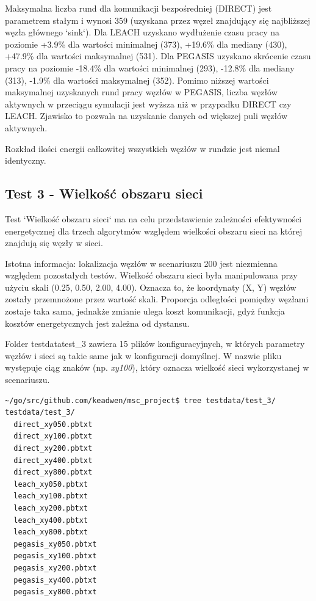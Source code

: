 \documentclass[a4paper,12pt,twoside,openany]{report}
\begin{document}
\par
Maksymalna liczba rund dla komunikacji bezpośredniej (DIRECT) jest parametrem stałym i wynosi 359 (uzyskana przez węzeł znajdujący się najbliższej węzła głównego `sink`).
Dla LEACH uzyskano wydłużenie czasu pracy na poziomie +3.9\% dla wartości minimalnej (373), +19.6\% dla mediany (430), +47.9\% dla wartości maksymalnej (531).
Dla PEGASIS uzyskano skrócenie czasu pracy na poziomie -18.4\% dla wartości minimalnej (293), -12.8\% dla mediany (313), -1.9\% dla wartości maksymalnej (352).
Pomimo niższej wartości maksymalnej uzyskanych rund pracy węzłów w PEGASIS, liczba węzłów aktywnych w przeciągu symulacji jest wyższa niż w przypadku DIRECT czy LEACH.
Zjawisko to pozwala na uzyskanie danych od większej puli węzłów aktywnych.
\par
Rozkład ilości energii całkowitej wszystkich węzłów w rundzie jest niemal identyczny.

\subsection{Test 3 - Wielkość obszaru sieci}

Test `Wielkość obszaru sieci` ma na celu przedstawienie zależności efektywności energetycznej dla trzech algorytmów względem wielkości obszaru sieci na której
znajdują się węzły w sieci.

Istotna informacja: lokalizacja węzłów w scenariuszu 200 jest niezmienna względem pozostałych testów. Wielkość obszaru sieci była manipulowana przy użyciu skali (0.25, 0.50, 2.00, 4.00).
Oznacza to, że koordynaty (X, Y) węzłów zostały przemnożone przez wartość skali. Proporcja odległości pomiędzy węzłami zostaje taka sama, jednakże zmianie ulega koszt komunikacji, gdyż 
funkcja kosztów energetycznych jest zależna od dystansu.

Folder testdata\/test\_3 zawiera 15 plików konfiguracyjnych, w których parametry węzłów i sieci są takie same jak w konfiguracji domyślnej.
W nazwie pliku występuje ciąg znaków (np. \textit{xy100}), który oznacza wielkość sieci wykorzystanej w scenariuszu.

\begin{lstlisting}
~/go/src/github.com/keadwen/msc_project$ tree testdata/test_3/
testdata/test_3/
  direct_xy050.pbtxt
  direct_xy100.pbtxt
  direct_xy200.pbtxt
  direct_xy400.pbtxt
  direct_xy800.pbtxt
  leach_xy050.pbtxt
  leach_xy100.pbtxt
  leach_xy200.pbtxt
  leach_xy400.pbtxt
  leach_xy800.pbtxt
  pegasis_xy050.pbtxt
  pegasis_xy100.pbtxt
  pegasis_xy200.pbtxt
  pegasis_xy400.pbtxt
  pegasis_xy800.pbtxt
\end{lstlisting}
\end{document}
